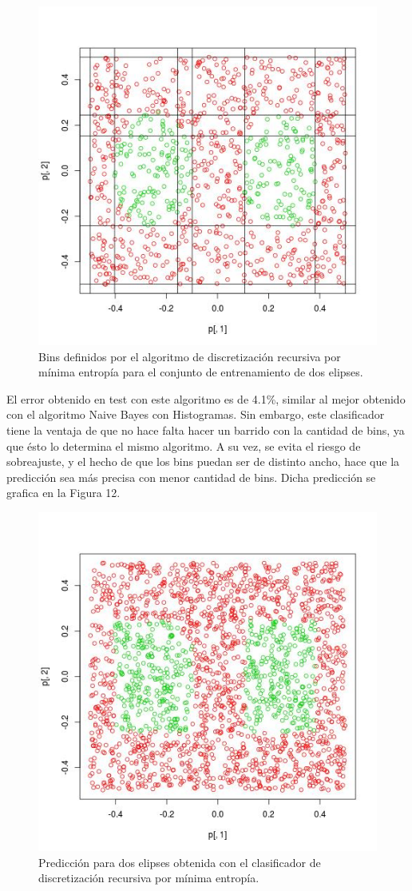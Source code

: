 \documentclass[12pt, a4paper]{article}
\begin{document}
\begin{figure}
    \centering
	\includegraphics[scale=0.45]{ej6bins}
	\caption{Bins definidos por el algoritmo de discretización recursiva por mínima entropía para el conjunto de entrenamiento de dos elipses.}
\end{figure}

El error obtenido en test con este algoritmo es de 4.1\%, similar al mejor obtenido con el algoritmo Naive Bayes con Histogramas. Sin embargo, este clasificador tiene la ventaja de que no hace falta hacer un barrido con la cantidad de bins, ya que ésto lo determina el mismo algoritmo. A su vez, se evita el riesgo de sobreajuste, y el hecho de que los bins puedan ser de distinto ancho, hace que la predicción sea más precisa con menor cantidad de bins. Dicha predicción se grafica en la Figura 12.

\begin{figure}
    \centering
	\includegraphics[scale=0.45]{dos_elipses_6}
	\caption{Predicción para dos elipses obtenida con el clasificador de discretización recursiva por mínima entropía.}
\end{figure}
\end{document}
